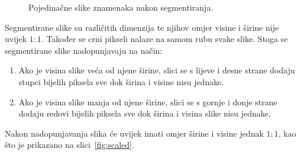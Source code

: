 \begin{figure}[htb]
    \caption{Pojedinačne slike znamenaka nakon segmentiranja.}
    \label{fig:segmented}
\end{figure}
\newline
Segmentirane slike su različitih dimenzija te njihov omjer visine i širine nije uvijek $1:1$. Također se crni pikseli
nalaze na samom rubu svake slike. Stoga se segmentirane slike nadopunjavaju na način:
\begin{enumerate}
    \item Ako je visina slike veća od njene širine, slici se s lijeve i desne strane dodaju stupci bijelih piksela sve
    dok širina i visine nisu jednake.
    \item Ako je visina slike manja od njene širine, slici se s gornje i donje strane dodaju redovi bijelih piksela
    sve dok širina i visina slike nisu jednake.
\end{enumerate}
Nakon nadopunjavanja slika će uvijek imati omjer širine i visine jednak $1:1$, kao što je prikazano na
slici\ \ref{fig:scaled}.
